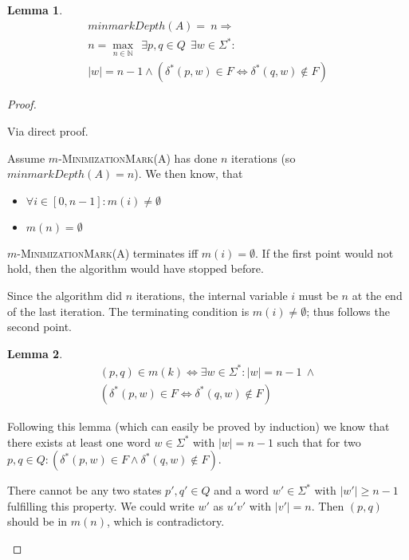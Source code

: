 \documentclass[a4paper, oneside, 11pt]{report}
\newtheorem{lemma}{Lemma}
\theoremstyle{definition}
\theoremstyle{remark}
\newcommand{\MinMark}{\textsc{MinimizationMark}}
\begin{document}
\begin{lemma}
	\begin{multline*}
	minmarkDepth(A) =\ n \Rightarrow \\
	n = \max_{n \in \mathbb{N}}\ \ \exists p, q \in Q\ \ \exists w \in \Sigma^* \colon \\
	|w| = n - 1 \land (\delta^*(p,w) \in F \Leftrightarrow \delta^*(q,w) \notin F)
	\end{multline*}
\end{lemma}

\begin{proof}
	\begin{description}
		\item
		
		Via direct proof.
		
		Assume $m$-\MinMark(A) has done $n$ iterations (so $minmarkDepth(A) = n$). We then know, that
		\begin{itemize}
			\item $\forall i \in [0,n-1]\colon m(i) \neq \emptyset$
			\item $m(n)= \emptyset$
		\end{itemize}
		$m$-\MinMark(A) terminates iff $m(i) = \emptyset$. If the first point would not hold, then the algorithm would have stopped before.
		
		Since the algorithm did $n$ iterations, the internal variable $i$ must be $n$ at the end of the last iteration. The terminating condition is $m(i) \neq \emptyset$; thus follows the second point.
		
		\begin{lemma}
			\begin{multline*}
			(p,q) \in m(k) \Longleftrightarrow 
			\exists w\in\Sigma^*\colon |w| = n - 1\ \land \\
			(\delta^*(p,w) \in F \Leftrightarrow \delta^*(q,w) \notin F)
			\end{multline*}
		\end{lemma}
		
		Following this lemma (which can easily be proved by induction) we know that there exists at least one word $w\in\Sigma^*$ with $|w| = n-1$ such that for two $p,q \in Q\colon (\delta^*(p,w) \in F \land \delta^*(q,w) \notin F)$.
		
		There cannot be any two states $p',q'\in Q$ and a word $w'\in\Sigma^*$ with $|w'| \ge n-1$ fulfilling this property. We could write $w'$ as $u'v'$ with $|v'| = n$. Then $(p,q)$ should be in $m(n)$, which is contradictory.
	\end{description}
\end{proof}
\end{document}
